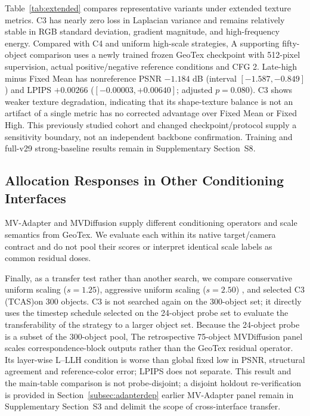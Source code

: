 \documentclass[times,twocolumn,final]{elsarticle}
\providecommand{\DIFadd}[1]{{\protect\color{blue} \sf #1}} %
\providecommand{\DIFdel}[1]{{\protect\color{red} \scriptsize #1}} %
\providecommand{\DIFaddbegin}{} %
\providecommand{\DIFaddend}{} %
\providecommand{\DIFdelbegin}{} %
\providecommand{\DIFdelend}{} %
\begin{document}
\DIFdelbegin \DIFdel{Table~\ref{tab:extended} compares representative variants under extended texture metrics. C3 has nearly zero loss in Laplacian variance and remains relatively stable in RGB standard deviation, gradient magnitude, and high-frequency energy. Compared with C4 and uniform high-scale strategies, }\DIFdelend \DIFaddbegin \DIFadd{A supporting fifty-object comparison uses a newly trained frozen GeoTex checkpoint with 512-pixel supervision, actual positive/negative reference conditions and CFG 2. Late-high minus Fixed Mean has nonreference PSNR $-1.184$ dB (interval $[-1.587,-0.849]$) and LPIPS $+0.00266$ ($[-0.00003,+0.00640]$; adjusted $p=0.080$). }\DIFaddend C3 \DIFdelbegin \DIFdel{shows weaker texture degradation, indicating that its shape-texture balance is not an artifact of a single metric}\DIFdelend \DIFaddbegin \DIFadd{has no corrected advantage over Fixed Mean or Fixed High. This previously studied cohort and changed checkpoint/protocol supply a sensitivity boundary, not an independent backbone confirmation. Training and full-v29 strong-baseline results remain in Supplementary Section~S8}\DIFaddend .

\DIFdelbegin %

\DIFdelend \DIFaddbegin \subsection{Allocation Responses in Other Conditioning Interfaces}
\label{subsec:cross-interface}
\DIFadd{MV-Adapter and MVDiffusion supply different conditioning operators and scale semantics from GeoTex. We evaluate each within its native target/camera contract and do not pool their scores or interpret identical scale labels as common residual doses.
}\DIFaddend 

\DIFdelbegin \DIFdel{Finally, as a transfer test rather than another search, we compare conservative uniform scaling ($s = 1.25$), aggressive uniform scaling ($s = 2.50$) , and selected C3 (TCAS)on 300 objects. C3 is not searched again on the 300-object set; it directly uses the timestep schedule selected on the 24-object probe set to evaluate the transferability of the strategy to a larger object set. Because the 24-object probe is a subset of the 300-object pool, }\DIFdelend \DIFaddbegin \DIFadd{The retrospective 75-object MVDiffusion panel scales correspondence-block outputs rather than the GeoTex residual operator. Its layer-wise L--LLH condition is worse than global fixed low in PSNR, structural agreement and reference-color error; LPIPS does not separate. This result and }\DIFaddend the \DIFdelbegin \DIFdel{main-table comparison is not probe-disjoint; a disjoint holdout re-verification is provided in Section~\ref{subsec:adapterdep}}\DIFdelend \DIFaddbegin \DIFadd{earlier MV-Adapter panel remain in Supplementary Section~S3 and delimit the scope of cross-interface transfer}\DIFaddend .
\end{document}

